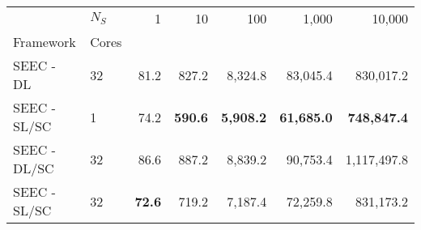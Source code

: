 \begin{tabular}{llrrrrr}
\toprule
 & $N_S$ & 1 & 10 & 100 & 1,000 & 10,000 \\
Framework & Cores &  &  &  &  &  \\
\midrule
SEEC - DL & 32 & 81.2 & 827.2 & 8,324.8 & 83,045.4 & 830,017.2 \\
\cline{1-7}
SEEC - SL/SC & 1 & 74.2 & \bfseries 590.6 & \bfseries 5,908.2 & \bfseries 61,685.0 & \bfseries 748,847.4 \\
\cline{1-7}
SEEC - DL/SC & 32 & 86.6 & 887.2 & 8,839.2 & 90,753.4 & 1,117,497.8 \\
\cline{1-7}
SEEC - SL/SC & 32 & \bfseries 72.6 & 719.2 & 7,187.4 & 72,259.8 & 831,173.2 \\
\bottomrule
\end{tabular}
